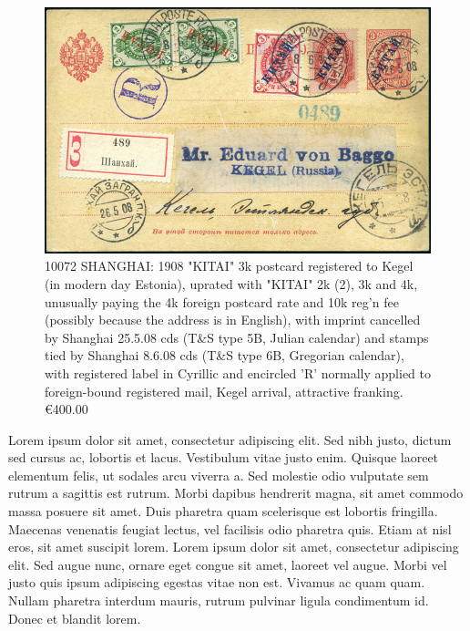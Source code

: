 \begin{figure}[htbp]
\centering
\includegraphics[width=.95\textwidth]{../russian-post-offices-in-china/10072.jpg}
\caption{
10072	SHANGHAI: 1908 "KITAI" 3k postcard registered to Kegel 
(in modern day Estonia), uprated with "KITAI" 2k (2), 3k and 4k, 
unusually paying the 4k foreign postcard rate and 10k reg'n fee 
(possibly because the address is in English), with imprint cancelled 
by Shanghai 25.5.08 cds (T\&S type 5B, Julian calendar) and stamps tied 
by Shanghai 8.6.08 cds (T\&S type 6B, Gregorian calendar), with registered
label in Cyrillic and encircled 'R' normally applied to foreign-bound 
registered mail, Kegel arrival, attractive franking.
\euro400.00 
}  
\end{figure}

Lorem ipsum dolor sit amet, consectetur adipiscing elit. Sed nibh justo, dictum sed cursus ac, lobortis et lacus. Vestibulum vitae justo enim. Quisque laoreet elementum felis, ut sodales arcu viverra a. Sed molestie odio vulputate sem rutrum a sagittis est rutrum. Morbi dapibus hendrerit magna, sit amet commodo massa posuere sit amet. Duis pharetra quam scelerisque est lobortis fringilla. Maecenas venenatis feugiat lectus, vel facilisis odio pharetra quis. Etiam at nisl eros, sit amet suscipit lorem. Lorem ipsum dolor sit amet, consectetur adipiscing elit. Sed augue nunc, ornare eget congue sit amet, laoreet vel augue. Morbi vel justo quis ipsum adipiscing egestas vitae non est. Vivamus ac quam quam. Nullam pharetra
                                                    interdum mauris, rutrum pulvinar ligula condimentum id. Donec et blandit lorem. 

